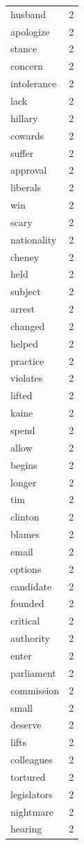 \begin{tabular}{lr}
husband & 2 \\
apologize & 2 \\
stance & 2 \\
concern & 2 \\
intolerance & 2 \\
lack & 2 \\
hillary & 2 \\
cowards & 2 \\
suffer & 2 \\
approval & 2 \\
liberals & 2 \\
win & 2 \\
scary & 2 \\
nationality & 2 \\
cheney & 2 \\
held & 2 \\
subject & 2 \\
arrest & 2 \\
changed & 2 \\
helped & 2 \\
practice & 2 \\
violates & 2 \\
lifted & 2 \\
kaine & 2 \\
spend & 2 \\
allow & 2 \\
begins & 2 \\
longer & 2 \\
tim & 2 \\
clinton & 2 \\
blames & 2 \\
email & 2 \\
options & 2 \\
candidate & 2 \\
founded & 2 \\
critical & 2 \\
authority & 2 \\
enter & 2 \\
parliament & 2 \\
commission & 2 \\
small & 2 \\
deserve & 2 \\
lifts & 2 \\
colleagues & 2 \\
tortured & 2 \\
legislators & 2 \\
nightmare & 2 \\
hearing & 2 \\

\end{tabular}
